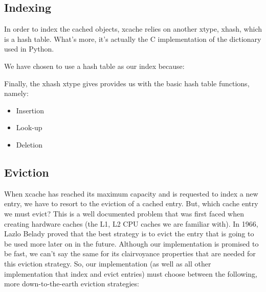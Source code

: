 \subsection{Indexing}

In order to index the cached objects, xcache relies on another xtype, xhash, 
which is a hash table. What's more, it's actually the C implementation of the 
dictionary used in Python.

We have chosen to use a hash table as our index because:


Finally, the xhash xtype gives provides us with the basic hash table functions, 
namely:

\begin{itemize}
	\item Insertion
	\item Look-up
	\item Deletion
\end{itemize}

\subsection{Eviction}

When xcache has reached its maximum capacity and is requested to index a new 
entry, we have to resort to the eviction of a cached entry. But, which cache 
entry we must evict? This is a well documented problem that was first faced 
when creating hardware caches (the L1, L2 CPU caches we are familiar with). In 
1966, Lazlo Belady %
proved that the best strategy is to evict the entry that is going to be used 
more later on in the future. Although our implementation is promised to be 
fast, we can't say the same for its clairvoyance properties that are needed for 
this eviction strategy. So, our implementation (as well as all other 
implementation that index and evict entries) must choose between the following, 
more down-to-the-earth eviction strategies:

